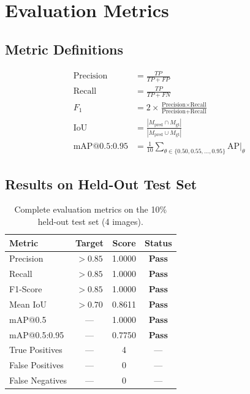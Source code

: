 \documentclass[12pt, a4paper, twoside]{report}
\begin{document}
\section{Evaluation Metrics}

\subsection{Metric Definitions}
\begin{align}
\text{Precision} &= \frac{TP}{TP + FP} \label{eq:precision} \\[6pt]
\text{Recall} &= \frac{TP}{TP + FN} \label{eq:recall} \\[6pt]
F_1 &= 2 \times \frac{\text{Precision} \times \text{Recall}}{\text{Precision} + \text{Recall}} \label{eq:f1} \\[6pt]
\text{IoU} &= \frac{|M_{\text{pred}} \cap M_{\text{gt}}|}{|M_{\text{pred}} \cup M_{\text{gt}}|} \label{eq:iou} \\[6pt]
\text{mAP@0.5:0.95} &= \frac{1}{10}\sum_{\theta \in \{0.50, 0.55, \ldots, 0.95\}} \text{AP}\big|_{\theta} \label{eq:map}
\end{align}

\subsection{Results on Held-Out Test Set}
\begin{table}[H]
\centering
\caption{Complete evaluation metrics on the 10\% held-out test set (4 images).}
\label{tab:eval-metrics}
\begin{tabular}{lccc}
\toprule
\textbf{Metric} & \textbf{Target} & \textbf{Score} & \textbf{Status} \\
\midrule
Precision       & $> 0.85$ & 1.0000 & \textcolor{passfg}{\textbf{Pass}} \\
Recall          & $> 0.85$ & 1.0000 & \textcolor{passfg}{\textbf{Pass}} \\
F1-Score        & $> 0.85$ & 1.0000 & \textcolor{passfg}{\textbf{Pass}} \\
Mean IoU        & $> 0.70$ & 0.8611 & \textcolor{passfg}{\textbf{Pass}} \\
mAP@0.5         & ---      & 1.0000 & \textcolor{passfg}{\textbf{Pass}} \\
mAP@0.5:0.95    & ---      & 0.7750 & \textcolor{passfg}{\textbf{Pass}} \\
True Positives  & ---      & 4      & --- \\
False Positives & ---      & 0      & --- \\
False Negatives & ---      & 0      & --- \\
\bottomrule
\end{tabular}
\end{table}
\end{document}
